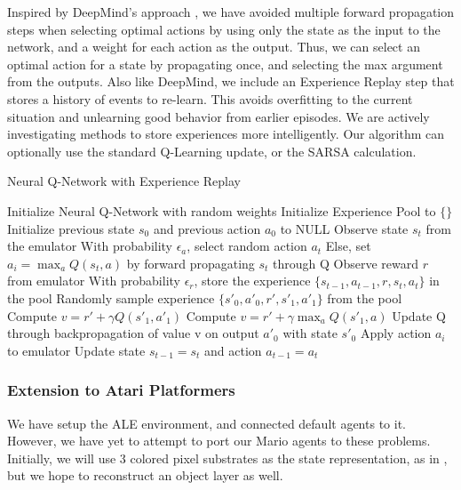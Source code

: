 \documentclass{article}
\begin{document}
Inspired by DeepMind's approach \cite{Mnih13}, we have avoided multiple forward propagation steps when selecting optimal actions by using only the state as the input to the network, and a weight for each action as the output. Thus, we can select an optimal action for a state by propagating once, and selecting the max argument from the outputs. Also like DeepMind, we include an Experience Replay step that stores a history of events to re-learn. This avoids overfitting to the current situation and unlearning good behavior from earlier episodes. We are actively investigating methods to store experiences more intelligently. Our algorithm can optionally use the standard Q-Learning update, or the SARSA calculation.

\begin{algorithm}[tb]
   \caption{Neural Q-Network with Experience Replay}
   \label{alg:q-learn}
\begin{algorithmic}
   \STATE Initialize Neural Q-Network with random weights
   \STATE Initialize Experience Pool to $\{ \}$
   \STATE Initialize previous state $s_0$ and previous action $a_0$ to NULL
   \STATE Observe state $s_t$ from the emulator
   \STATE With probability $\epsilon_a$, select random action $a_t$
   \STATE Else, set $a_i = \max_a Q(s_t, a)$ by forward propagating $s_t$ through Q
   \STATE Observe reward $r$ from emulator
   \STATE With probability $\epsilon_r$, store the experience $\{s_{t-1}, a_{t-1}, r, s_t, a_t \}$ in the pool
   \ENDIF
   \STATE Randomly sample experience $\{s'_0, a'_0, r', s'_1, a'_1 \}$ from the pool
   \STATE Compute $v = r' + \gamma Q(s'_1, a'_1)$
   \ELSE
   \STATE Compute $v = r' + \gamma \max_a Q(s'_1, a)$
   \ENDIF
   \STATE Update Q through backpropagation of value v on output $a'_0$ with state $s'_0$
   \ENDFOR
   \STATE Apply action $a_i$ to emulator
   \STATE Update state $s_{t-1} = s_t$ and action $a_{t-1} = a_t$
   \ENDFOR
   \ENDFOR
\end{algorithmic}
\end{algorithm}

\subsubsection{Extension to Atari Platformers}
We have setup the ALE environment, and connected default agents to it. However, we have yet to attempt to port our Mario agents to these problems. Initially, we will use 3 colored pixel substrates as the state representation, as in \cite{Hauskneck13}, but we hope to reconstruct an object layer as well.
 
\end{document}
